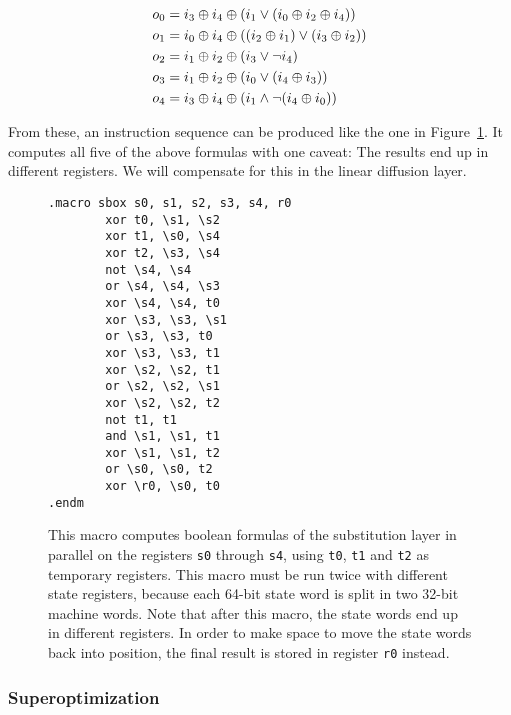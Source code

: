 \begin{samepage}
\begin{align*}
   o_0 & = i_3 \oplus i_4 \oplus (i_1 \vee (i_0 \oplus i_2 \oplus i_4))
\\ o_1 & = i_0 \oplus i_4 \oplus ((i_2 \oplus i_1) \vee (i_3 \oplus i_2))
\\ o_2 & = i_1 \oplus i_2 \oplus (i_3 \vee \neg i_4)
\\ o_3 & = i_1 \oplus i_2 \oplus (i_0 \vee (i_4 \oplus i_3))
\\ o_4 & = i_3 \oplus i_4 \oplus (i_1 \wedge \neg (i_4 \oplus i_0))
\end{align*}
\end{samepage}

From these, an instruction sequence can be produced like the one in
Figure~\ref{substitution}. It computes all five of the above formulas with one
caveat: The results end up in different registers. We will compensate
for this in the linear diffusion layer.

\begin{figure}
\begin{verbatim}
.macro sbox s0, s1, s2, s3, s4, r0
        xor t0, \s1, \s2
        xor t1, \s0, \s4
        xor t2, \s3, \s4
        not \s4, \s4
        or \s4, \s4, \s3
        xor \s4, \s4, t0
        xor \s3, \s3, \s1
        or \s3, \s3, t0
        xor \s3, \s3, t1
        xor \s2, \s2, t1
        or \s2, \s2, \s1
        xor \s2, \s2, t2
        not t1, t1
        and \s1, \s1, t1
        xor \s1, \s1, t2
        or \s0, \s0, t2
        xor \r0, \s0, t0
.endm
\end{verbatim}

\caption{This macro computes boolean formulas of the substitution layer in
parallel on the registers \texttt{s0} through \texttt{s4}, using \texttt{t0},
\texttt{t1} and \texttt{t2} as temporary registers. This macro must be run
twice with different state registers, because each 64-bit state word is split in
two 32-bit machine words. Note that after this macro, the state words end up
in different registers. In order to make space to move the state words back into
position, the final result is stored in register \texttt{r0} instead.}

\label{substitution}
\end{figure}

\subsubsection{Superoptimization}

